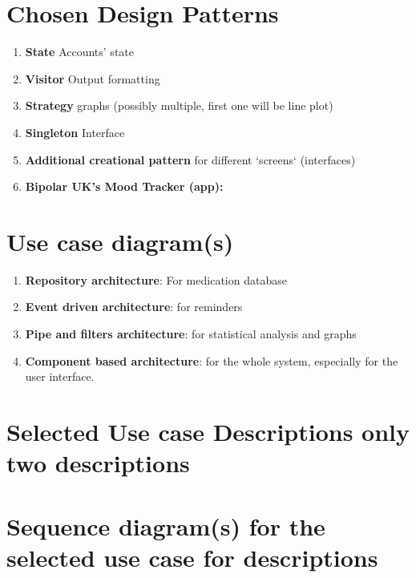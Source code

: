 \documentclass[11pt]{article}
\begin{document}
     \section{Chosen Design Patterns}\label{sec:chosen-design-patterns}

     \begin{enumerate}
         \item \textbf{State} Accounts' state\cite{RefactoringGuru}
         \item \textbf{Visitor} Output formatting\cite{RefactoringGuru}
         \item \textbf{Strategy} graphs (possibly multiple, first one will be line plot)\cite{RefactoringGuru} %
         \item \textbf{Singleton} Interface\cite{RefactoringGuru}
         \item \textbf{Additional creational pattern} for different `screens` (interfaces)\cite{RefactoringGuru}
         \item \textbf{Bipolar UK’s Mood Tracker (app):} \cite{BiPolUK}
     \end{enumerate}


     \section{Use case diagram(s)}\label{sec:use-case-diagram(s)}

     \begin{enumerate}
         \item \textbf{Repository architecture}: For medication database
         \item \textbf{Event driven architecture}: for reminders
         \item \textbf{Pipe and filters architecture}: for statistical analysis and graphs
         \item \textbf{Component based architecture}: for the whole system, especially for the user interface.
     \end{enumerate}


     \section{Selected Use case Descriptions {only two descriptions}}\label{sec:selected-use-case-descriptions}


     \section{Sequence diagram(s) {for the selected use case for descriptions}}\label{sec:sequence-diagram(s)}
\end{document}

